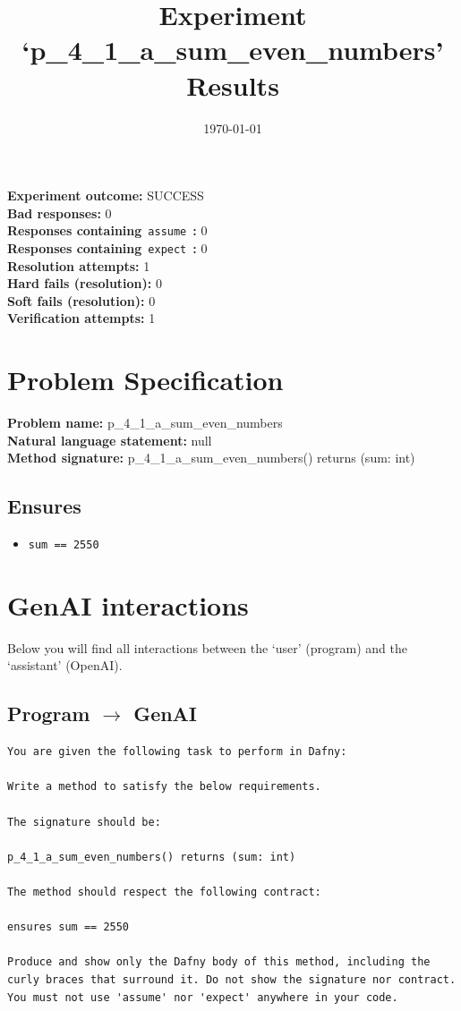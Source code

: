\documentclass{article}
\begin{document}
\title{Experiment `p\_4\_1\_a\_sum\_even\_numbers' Results}
\author{\today}
\date{}
\maketitle
\textbf{Experiment outcome: }SUCCESS
\\\textbf{Bad responses: }0
\\\textbf{Responses containing}~\texttt{assume}~\textbf{: }0
\\\textbf{Responses containing}~\texttt{expect}~\textbf{: }0
\\\textbf{Resolution attempts: }1
\\\textbf{Hard fails (resolution): }0
\\\textbf{Soft fails (resolution): }0
\\\textbf{Verification attempts: }1
\section*{Problem Specification}
\textbf{Problem name: }p\_4\_1\_a\_sum\_even\_numbers
\\\textbf{Natural language statement: }null
\\\textbf{Method signature: }p\_4\_1\_a\_sum\_even\_numbers() returns (sum: int)
\subsection*{Ensures}
\begin{itemize}
\item \texttt{sum == 2550}
\end{itemize}
\clearpage
\section*{GenAI interactions}
Below you will find all interactions between the `user' (program) and the `assistant' (OpenAI).
\subsection*{Program $\rightarrow$ GenAI}
\begin{lstlisting}
You are given the following task to perform in Dafny:

Write a method to satisfy the below requirements.

The signature should be:

p_4_1_a_sum_even_numbers() returns (sum: int)

The method should respect the following contract:

ensures sum == 2550

Produce and show only the Dafny body of this method, including the curly braces that surround it. Do not show the signature nor contract. You must not use 'assume' nor 'expect' anywhere in your code.
\end{lstlisting}
\end{document}
